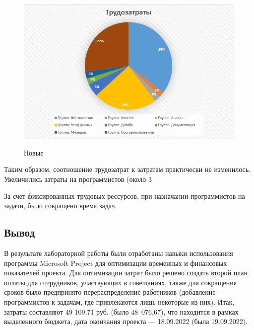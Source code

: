 \begin{figure}[ht!]
	\includegraphics[width=0.75\linewidth]{assets/images/tryd-3.png}
	\label{fig:r2}
	\caption{Новые}
\end{figure}
\FloatBarrier

Таким образом, соотношение трудозатрат к затратам практически не изменилось. Увеличились затраты на программистов (около 3%

За счет фиксированных трудовых рессурсов, при назначании программистов на задачи, было сокращено время задач.

\subsection*{Вывод}

В результате лабораторной работы были отработаны навыки использования программы Microsoft Project для оптимизации временных и финансовых показателей проекта. Для оптимизации затрат было решено создать второй план оплаты для сотрудников, участвующих в совещаниях, также для сокращения сроков было предпринято перераспределение работников (добавление программистов к задачам, где привлекаются лишь некоторые из них). 
Итак, затраты составляют 49 109,71 руб. (было 48 076,67), что находится в рамках выделенного бюджета, дата окончания проекта –-- 18.09.2022 (была 19.09.2022).
